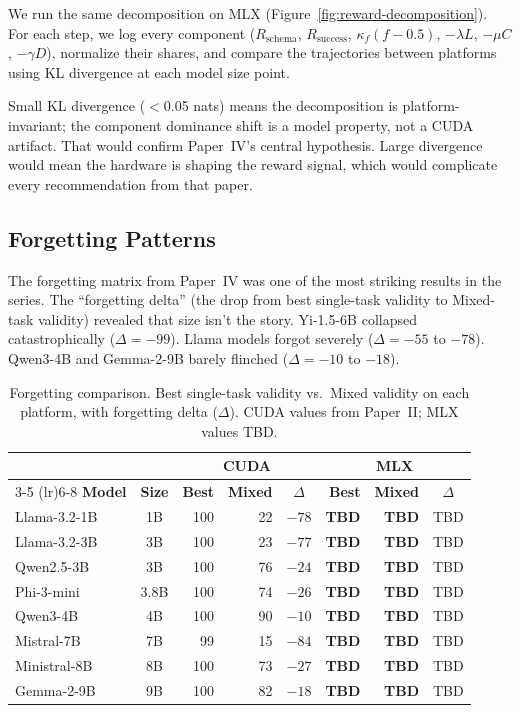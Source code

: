 \documentclass[11pt]{article}
\begin{document}
We run the same decomposition on MLX (Figure~\ref{fig:reward-decomposition}).  For each step, we log every component ($R_{\text{schema}}$, $R_{\text{success}}$, $\kappa_f(f-0.5)$, $-\lambda L$, $-\mu C$, $-\gamma D$), normalize their shares, and compare the trajectories between platforms using KL divergence at each model size point.

Small KL divergence ($<$0.05 nats) means the decomposition is platform-invariant; the component dominance shift is a model property, not a CUDA artifact.  That would confirm Paper~IV's central hypothesis.  Large divergence would mean the hardware is shaping the reward signal, which would complicate every recommendation from that paper.

\subsection{Forgetting Patterns}
\label{sec:forgetting}

The forgetting matrix from Paper~IV was one of the most striking results in the series.  The ``forgetting delta'' (the drop from best single-task validity to Mixed-task validity) revealed that size isn't the story.  Yi-1.5-6B collapsed catastrophically ($\Delta = -99$).  Llama models forgot severely ($\Delta = -55$ to $-78$).  Qwen3-4B and Gemma-2-9B barely flinched ($\Delta = -10$ to $-18$).

\begin{table}[t]
\centering
\caption{Forgetting comparison.  Best single-task validity vs.\ Mixed validity on each platform, with forgetting delta ($\Delta$). CUDA values from Paper~II; MLX values TBD.}
\label{tab:forgetting}
\small
\begin{tabular}{lc rrc rrc}
\toprule
& & \multicolumn{3}{c}{\textbf{CUDA}} & \multicolumn{3}{c}{\textbf{MLX}} \\
\cmidrule(lr){3-5} \cmidrule(lr){6-8}
\textbf{Model} & \textbf{Size} & \textbf{Best} & \textbf{Mixed} & $\Delta$ & \textbf{Best} & \textbf{Mixed} & $\Delta$ \\
\midrule
Llama-3.2-1B & 1B & 100 & 22 & $-78$ & \textbf{TBD} & \textbf{TBD} & TBD \\
Llama-3.2-3B & 3B & 100 & 23 & $-77$ & \textbf{TBD} & \textbf{TBD} & TBD \\
Qwen2.5-3B & 3B & 100 & 76 & $-24$ & \textbf{TBD} & \textbf{TBD} & TBD \\
Phi-3-mini & 3.8B & 100 & 74 & $-26$ & \textbf{TBD} & \textbf{TBD} & TBD \\
Qwen3-4B & 4B & 100 & 90 & $-10$ & \textbf{TBD} & \textbf{TBD} & TBD \\
Mistral-7B & 7B & 99 & 15 & $-84$ & \textbf{TBD} & \textbf{TBD} & TBD \\
Ministral-8B & 8B & 100 & 73 & $-27$ & \textbf{TBD} & \textbf{TBD} & TBD \\
Gemma-2-9B & 9B & 100 & 82 & $-18$ & \textbf{TBD} & \textbf{TBD} & TBD \\
\bottomrule
\end{tabular}
\end{table}
\end{document}
